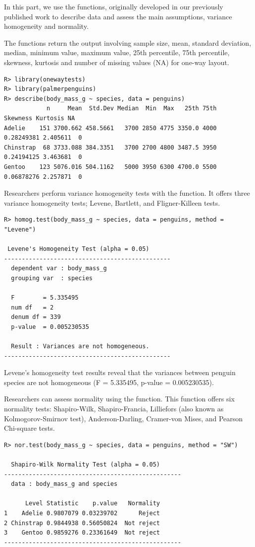In this part, we use the functions, originally developed in our previously published work \citep{dag2018onewaytests} to describe data and assess the main assumptions, variance homogeneity and normality. 

The  functions return the output involving sample size, mean, standard deviation, median, minimum value, maximum value, 25th percentile, 75th percentile, skewness, kurtosis and number of missing values (NA) for one-way layout.

\begin{verbatim}
R> library(onewaytests)
R> library(palmerpenguins) 
R> describe(body_mass_g ~ species, data = penguins)
            n     Mean  Std.Dev Median  Min  Max   25th 75th   Skewness Kurtosis NA
Adelie    151 3700.662 458.5661   3700 2850 4775 3350.0 4000 0.28249381 2.405611  0
Chinstrap  68 3733.088 384.3351   3700 2700 4800 3487.5 3950 0.24194125 3.463681  0
Gentoo    123 5076.016 504.1162   5000 3950 6300 4700.0 5500 0.06878276 2.257871  0
\end{verbatim}

Researchers perform variance homogeneity tests with the  function. It offers three variance homogeneity tests; Levene, Bartlett, and Fligner-Killeen tests.

\begin{verbatim}
R> homog.test(body_mass_g ~ species, data = penguins, method = "Levene")

 Levene's Homogeneity Test (alpha = 0.05) 
----------------------------------------------- 
  dependent var : body_mass_g 
  grouping var  : species 

  F        = 5.335495 
  num df   = 2 
  denum df = 339 
  p-value  = 0.005230535 

  Result : Variances are not homogeneous. 
----------------------------------------------- 

\end{verbatim}

Levene's homogeneity test results reveal that the variances between penguin species are not homogeneous  (F = 5.335495, p-value = 0.005230535).

Researchers can assess normality using the  function. This function offers six normality tests: Shapiro-Wilk, Shapiro-Francia, Lilliefors (also known as Kolmogorov-Smirnov test), Anderson-Darling, Cramer-von Mises, and Pearson Chi-square tests.

\begin{verbatim}
R> nor.test(body_mass_g ~ species, data = penguins, method = "SW")

  Shapiro-Wilk Normality Test (alpha = 0.05) 
-------------------------------------------------- 
  data : body_mass_g and species 

      Level Statistic    p.value   Normality
1    Adelie 0.9807079 0.03239702      Reject
2 Chinstrap 0.9844938 0.56050824  Not reject
3    Gentoo 0.9859276 0.23361649  Not reject
--------------------------------------------------
\end{verbatim}

